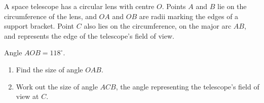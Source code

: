 \begin{question}
\noindent A space telescope has a circular lens with centre $O$. Points $A$ and $B$ lie on the circumference of the lens, and $OA$ and $OB$ are radii marking the edges of a support bracket. Point $C$ also lies on the circumference, on the major arc $AB$, and represents the edge of the telescope's field of view.

Angle $AOB = 118^\circ$.

\begin{center}
\end{center}

\begin{enumerate}
    \item[(a)] Find the size of angle $OAB$.

    \vspace{4cm}

    \item[(b)] Work out the size of angle $ACB$, the angle representing the telescope's field of view at $C$.

    \vspace{4cm}
\end{enumerate}
\end{question}
